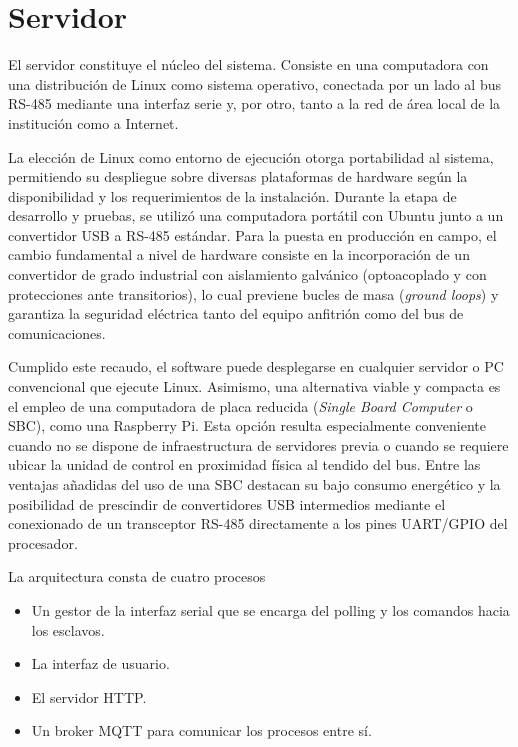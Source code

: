 
\section{Servidor}
El servidor constituye el núcleo del sistema. Consiste en una computadora con una distribución de Linux como sistema operativo, conectada por un lado al bus RS-485 mediante una interfaz serie y, por otro, tanto a la red de área local de la institución como a Internet.

La elección de Linux como entorno de ejecución otorga portabilidad al sistema, permitiendo su despliegue sobre diversas plataformas de hardware según la disponibilidad y los requerimientos de la instalación. Durante la etapa de desarrollo y pruebas, se utilizó una computadora portátil con Ubuntu junto a un convertidor USB a RS-485 estándar. Para la puesta en producción en campo, el cambio fundamental a nivel de hardware consiste en la incorporación de un convertidor de grado industrial con aislamiento galvánico (optoacoplado y con protecciones ante transitorios), lo cual previene bucles de masa (\textit{ground loops}) y garantiza la seguridad eléctrica tanto del equipo anfitrión como del bus de comunicaciones.

Cumplido este recaudo, el software puede desplegarse en cualquier servidor o PC convencional que ejecute Linux. Asimismo, una alternativa viable y compacta es el empleo de una computadora de placa reducida (\textit{Single Board Computer} o SBC), como una Raspberry Pi. Esta opción resulta especialmente conveniente cuando no se dispone de infraestructura de servidores previa o cuando se requiere ubicar la unidad de control en proximidad física al tendido del bus. Entre las ventajas añadidas del uso de una SBC destacan su bajo consumo energético y la posibilidad de prescindir de convertidores USB intermedios mediante el conexionado de un transceptor RS-485 directamente a los pines UART/GPIO del procesador.

La arquitectura consta de cuatro procesos

\begin{itemize}
    \item Un gestor de la interfaz serial que se encarga del polling y los comandos hacia los esclavos.
    \item La interfaz de usuario.
    \item El servidor HTTP.
    \item Un broker MQTT para comunicar los procesos entre sí.
\end{itemize}

